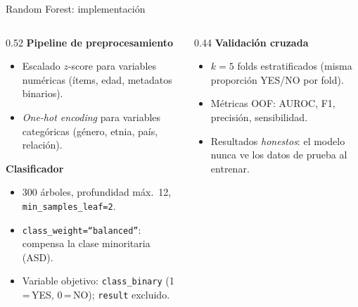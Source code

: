 \documentclass[11pt]{beamer}
\begin{document}
\begin{frame}{Random Forest: implementación}
  \begin{columns}[T]
    \begin{column}{0.52\textwidth}
      \textbf{Pipeline de preprocesamiento}
      \begin{itemize}
        \setlength{\itemsep}{0.2em}
        \footnotesize
        \item Escalado $z$-score para variables numéricas (ítems, edad, metadatos binarios).
        \item \emph{One-hot encoding} para variables categóricas (género, etnia, país, relación).
      \end{itemize}
      \vspace{0.4em}
      \textbf{Clasificador}
      \begin{itemize}
        \setlength{\itemsep}{0.2em}
        \footnotesize
        \item 300 árboles, profundidad máx.\ 12, \texttt{min\_samples\_leaf=2}.
        \item \texttt{class\_weight=``balanced''}: compensa la clase minoritaria (ASD).
        \item Variable objetivo: \texttt{class\_binary} (1\,=\,YES, 0\,=\,NO); \texttt{result} excluido.
      \end{itemize}
    \end{column}
    \begin{column}{0.44\textwidth}
      \textbf{Validación cruzada}
      \begin{itemize}
        \setlength{\itemsep}{0.2em}
        \footnotesize
        \item $k=5$ folds estratificados (misma proporción YES/NO por fold).
        \item Métricas OOF: AUROC, F1, precisión, sensibilidad.
        \item Resultados \emph{honestos}: el modelo nunca ve los datos de prueba al entrenar.
      \end{itemize}
    \end{column}
  \end{columns}
\end{frame}
\end{document}
